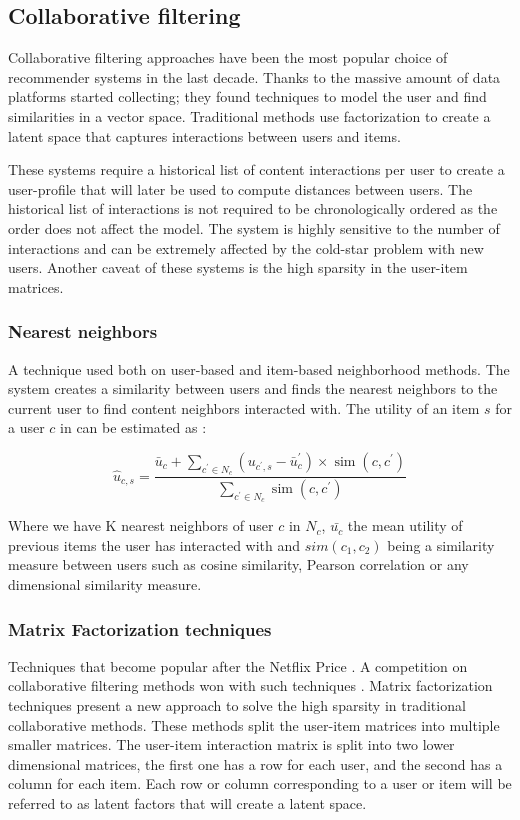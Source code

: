 \documentclass{tex_files/kththesis}
\begin{document}
\subsection{Collaborative filtering}
Collaborative filtering approaches have been the most popular choice of recommender systems in the last decade. Thanks to the massive amount of data platforms started collecting; they found techniques to model the user and find similarities in a vector space. Traditional methods use factorization to create a latent space that captures interactions between users and items.

These systems require a historical list of content interactions per user to create a user-profile that will later be used to compute distances between users. The historical list of interactions is not required to be chronologically ordered as the order does not affect the model. The system is highly sensitive to the number of interactions and can be extremely affected by the cold-star problem with new users. Another caveat of these systems is the high sparsity in the user-item matrices.

\subsubsection{Nearest neighbors}
A technique used both on user-based and item-based neighborhood methods. The system creates a similarity between users and finds the nearest neighbors to the current user to find content neighbors interacted with. The utility of an item $s$ for a user $c$ in can be estimated as \cite{knn}:

\begin{equation}
\hat{u}_{c, s}=\frac{\bar{u}_{c}+\sum_{c^{\prime} \in N_{c}}\left(u_{c^{\prime}, s}-\bar{u}_{c}^{\prime}\right) \times \operatorname{sim}\left(c, c^{\prime}\right)}{\sum_{c^{\prime} \in N_{c}} \operatorname{sim}\left(c, c^{\prime}\right)}
\end{equation}

Where we have K nearest neighbors of user $c$ in $N_c$, $\bar{u_c}$ the mean utility of previous items the user has interacted with and $sim(c_1,c_2)$ being a similarity measure between users such as cosine similarity, Pearson correlation or any dimensional similarity measure.


\subsubsection{Matrix Factorization techniques} \label{als}
Techniques that become popular after the Netflix Price \cite{netflix}. A competition on collaborative filtering methods won with such techniques \cite{matrix}. Matrix factorization techniques present a new approach to solve the high sparsity in traditional collaborative methods. These methods split the user-item matrices into multiple smaller matrices. The user-item interaction matrix is split into two lower dimensional matrices, the first one has a row for each user, and the second has a column for each item. Each row or column corresponding to a user or item will be referred to as latent factors \cite{latentspace} that will create a latent space.
\end{document}
